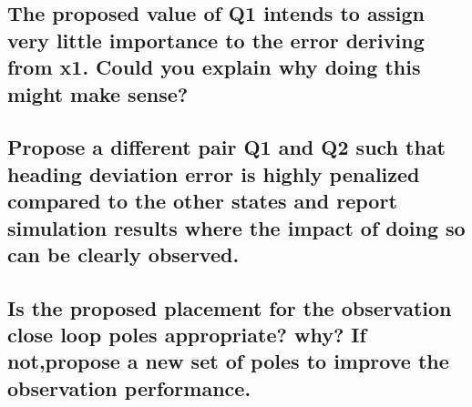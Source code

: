 \subsection{The proposed value of Q1 intends to assign very little importance to the error deriving from x1. Could you explain why doing this might make sense?}


\subsection{Propose a different pair Q1 and Q2 such that heading deviation error is highly penalized compared to the other states and report simulation results where the impact of doing so can be clearly observed.}


\subsection{Is the proposed placement for the observation close loop poles appropriate? why? If not,propose a new set of poles to improve the observation performance.}